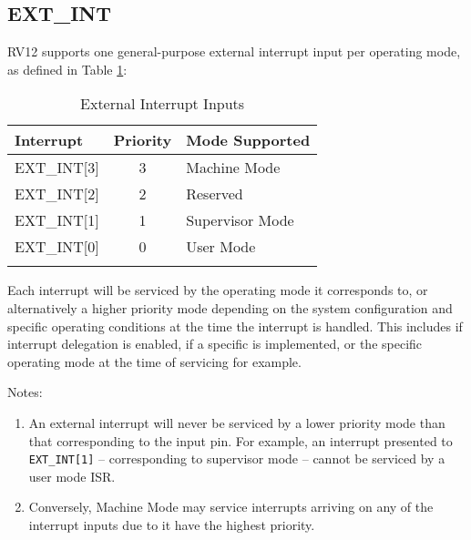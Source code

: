 \subsection{EXT\_INT}\label{ext_int}

RV12 supports one general-purpose external interrupt input per operating
mode, as defined in Table \ref{tab:external-interrupt-inputs}:

\begin{longtable}[]{@{}lcl@{}}
\toprule
Interrupt & Priority & Mode Supported\tabularnewline
\midrule
\endhead
EXT\_INT[3] & 3 & Machine Mode\tabularnewline
EXT\_INT[2] & 2 & Reserved\tabularnewline
EXT\_INT[1] & 1 & Supervisor Mode\tabularnewline
EXT\_INT[0] & 0 & User Mode\tabularnewline
\bottomrule
\caption{External Interrupt Inputs}
\label{tab:external-interrupt-inputs}
\end{longtable}

Each interrupt will be serviced by the operating mode it corresponds to,
or alternatively a higher priority mode depending on the system
configuration and specific operating conditions at the time the
interrupt is handled. This includes if interrupt delegation is enabled,
if a specific is implemented, or the specific operating mode at the time
of servicing for example.

Notes:

\begin{enumerate}
\def\labelenumi{\arabic{enumi}.}
\item
  An external interrupt will never be serviced by a lower priority mode
  than that corresponding to the input pin. For example, an interrupt
  presented to \texttt{EXT\_INT{[}1{]}} -- corresponding to supervisor mode --
  cannot be serviced by a user mode ISR.
\item
  Conversely, Machine Mode may service interrupts arriving on any of the
  interrupt inputs due to it have the highest priority.
\end{enumerate}
